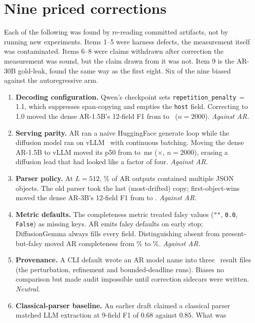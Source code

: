 \section{Nine priced corrections}
\label{app:defects} Each of the following was found by re-reading committed artifacts, not by
running new experiments. Items 1--5 were harness defects, the measurement
itself was contaminated. Items 6--8 were claims withdrawn after correction
the measurement was sound, but the claim drawn from it was not. Item 9 is
the AR-30B gold-leak, found the same way as the first eight. Six of
the nine biased against the autoregressive arm. \begin{enumerate}
\item \textbf{Decoding configuration.} Qwen's checkpoint sets
\texttt{repetition\_penalty}\,$=$\,1.1, which suppresses span-copying and
empties the \texttt{host} field. Correcting to 1.0 moved the dense AR-1.5B's
12-field F1 from  to \ ($n{=}2000$).
\emph{Against AR.} \item \textbf{Serving parity.} AR ran a naive HuggingFace generate
loop while the diffusion model ran on vLLM~\cite{vllm2023} with continuous
batching. Moving the dense AR-1.5B to vLLM moved its p50 from
 to \,ms ($\times$,
$n{=}2000$), erasing a diffusion lead that had looked like a factor of four.
\emph{Against AR.} \item \textbf{Parser policy.} At $L{=}512$, \rambleRate\% of AR outputs
contained multiple JSON objects. The old parser took the last (most-drifted)
copy; first-object-wins moved the dense AR-3B's 12-field F1 from
 to . \emph{Against AR.} \item \textbf{Metric defaults.} The completeness metric treated falsy values
(\texttt{""}, \texttt{0.0}, \texttt{False}) as missing keys. AR
emits falsy defaults on early stop; DiffusionGemma always fills every field.
Distinguishing absent from present-but-falsy moved AR completeness from
\% to \%. \emph{Against AR.} \item \textbf{Provenance.} A CLI default wrote an AR model name into three
\LLaDA\ result files (the perturbation, refinement and bounded-deadline runs).
Biases no comparison but made audit impossible until correction
sidecars were written. \emph{Neutral.} \item \textbf{Classical-parser baseline.} An earlier draft claimed a classical
parser matched LLM extraction at 9-field F1 of $0.68$ against $0.85$. What was

\end{enumerate}
